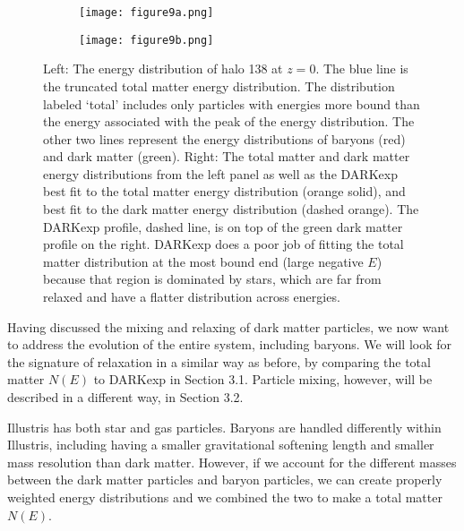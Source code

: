 \documentclass[a4paper,11pt]{article}
\begin{document}
\begin{figure*}
\centering
\begin{subfigure}{.5\textwidth}
  \centering
\texttt{[image: figure9a.png]}
  \label{fig:sub1}
\end{subfigure}%
\begin{subfigure}{.5\textwidth}
  \centering
\texttt{[image: figure9b.png]}
  \label{fig:sub2}
\end{subfigure}
\caption{Left: The energy distribution of halo 138 at $z=0$.  The blue line is the truncated total matter energy distribution.  The distribution 
labeled `total' includes only particles with energies more bound than the energy associated with the peak of the energy distribution.  The 
other two lines represent the energy distributions of baryons (red) and dark matter (green).  Right: The total matter and dark matter energy distributions 
from the left panel as well as the DARKexp best fit to the total matter energy distribution (orange solid), and best fit to the dark matter energy 
distribution (dashed orange).  The DARKexp profile, dashed line, is on top of the green dark matter profile on the right.  DARKexp does a 
poor job of fitting the total matter distribution at the most bound end (large negative $E$) because that region is dominated by stars, which are far from 
relaxed and have a flatter distribution across energies. 
}
\label{138NE}
\end{figure*}

Having discussed the mixing and relaxing of dark matter particles, we now want to address the evolution of the entire system, including baryons.  We will look 
for the signature of relaxation in a similar way as before, by comparing the total matter $N(E)$ to DARKexp in Section 3.1.  Particle mixing, however, will be described in a 
different way, in Section 3.2.

Illustris has both star and gas particles.  Baryons are handled differently within Illustris, including having a smaller gravitational softening length and smaller 
mass resolution than dark matter.  
However, if we account for the different masses between the dark matter particles and baryon particles, we can create properly weighted energy distributions and 
we combined the two to make a total matter $N(E)$.  
\end{document}
